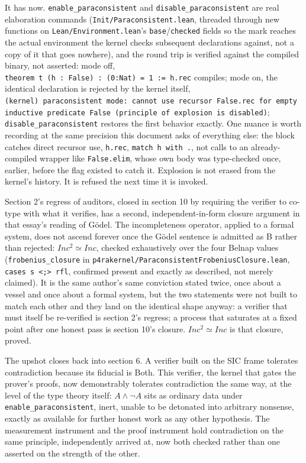 \documentclass[12pt,a4paper]{article}
\begin{document}
It has now. \texttt{enable\_paraconsistent} and
\texttt{disable\_paraconsistent} are real elaboration commands
(\texttt{Init/Paraconsistent.lean}, threaded through new functions on
\texttt{Lean/Environment.lean}'s \texttt{base}/\texttt{checked} fields
so the mark reaches the actual environment the kernel checks subsequent
declarations against, not a copy of it that goes nowhere), and the round
trip is verified against the compiled binary, not asserted: mode off,
\texttt{theorem\ t\ (h\ :\ False)\ :\ (0:Nat)\ =\ 1\ :=\ h.rec}
compiles; mode on, the identical declaration is rejected by the kernel
itself,
\texttt{(kernel)\ paraconsistent\ mode:\ cannot\ use\ recursor\ \textquotesingle{}False.rec\textquotesingle{}\ for\ empty\ inductive\ predicate\ \textquotesingle{}False\textquotesingle{}\ (principle\ of\ explosion\ is\ disabled)};
\texttt{disable\_paraconsistent} restores the first behavior exactly.
One nuance is worth recording at the same precision this document asks
of everything else: the block catches direct recursor use,
\texttt{h.rec}, \texttt{match\ h\ with\ .}, not calls to an
already-compiled wrapper like \texttt{False.elim}, whose own body was
type-checked once, earlier, before the flag existed to catch it.
Explosion is not erased from the kernel's history. It is refused the
next time it is invoked.

Section 2's regress of auditors, closed in section 10 by requiring the
verifier to co-type with what it verifies, has a second,
independent-in-form closure argument in that essay's reading of Gödel.
The incompleteness operator, applied to a formal system, does not ascend
forever once the Gödel sentence is admitted as B rather than rejected:
\({Inc^2 ≃ Inc}\), checked exhaustively over the four Belnap values
(\texttt{frobenius\_closure} in
\texttt{p4rakernel/ParaconsistentFrobeniusClosure.lean},
\texttt{cases\ s\ \textless{};\textgreater{}\ rfl}, confirmed present
and exactly as described, not merely claimed). It is the same author's
same conviction stated twice, once about a vessel and once about a
formal system, but the two statements were not built to match each other
and they land on the identical shape anyway: a verifier that must itself
be re-verified is section 2's regress; a process that saturates at a
fixed point after one honest pass is section 10's closure.
\({Inc^2 ≃ Inc}\) is that closure, proved.

The upshot closes back into section 6. A verifier built on the SIC frame
tolerates contradiction because its fiducial is Both. This verifier, the
kernel that gates the prover's proofs, now demonstrably tolerates
contradiction the same way, at the level of the type theory itself:
\({A ∧ ¬A}\) sits as ordinary data under
\texttt{enable\_paraconsistent}, inert, unable to be detonated into
arbitrary nonsense, exactly as available for further honest work as any
other hypothesis. The measurement instrument and the proof instrument
hold contradiction on the same principle, independently arrived at, now
both checked rather than one asserted on the strength of the other.
\end{document}

